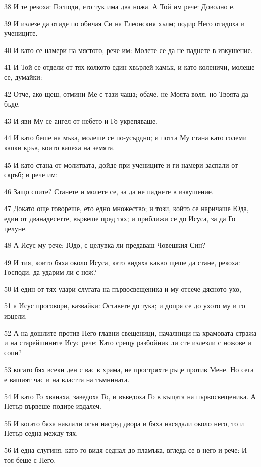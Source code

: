 \par 38 И те рекоха: Господи, ето тук има два ножа. А Той им рече: Доволно е.
\par 39 И излезе да отиде по обичая Си на Елеонския хълм; подир Него отидоха и учениците.
\par 40 И като се намери на мястото, рече им: Молете се да не паднете в изкушение.
\par 41 И Той се отдели от тях колкото един хвърлей камък, и като коленичи, молеше се, думайки:
\par 42 Отче, ако щеш, отмини Ме с тази чаша; обаче, не Моята воля, но Твоята да бъде.
\par 43 И яви Му се ангел от небето и Го укрепяваше.
\par 44 И като беше на мъка, молеше се по-усърдно; и потта Му стана като големи капки кръв, които капеха на земята.
\par 45 И като стана от молитвата, дойде при учениците и ги намери заспали от скръб; и рече им:
\par 46 Защо спите? Станете и молете се, за да не паднете в изкушение.
\par 47 Докато още говореше, ето едно множество; и този, който се наричаше Юда, един от дванадесетте, вървеше пред тях; и приближи се до Исуса, за да Го целуне.
\par 48 А Исус му рече: Юдо, с целувка ли предаваш Човешкия Син?
\par 49 И тия, които бяха около Исуса, като видяха какво щеше да стане, рекоха: Господи, да ударим ли с нож?
\par 50 И един от тях удари слугата на първосвещеника и му отсече дясното ухо,
\par 51 а Исус проговори, казвайки: Оставете до тука; и допря се до ухото му и го изцели.
\par 52 А на дошлите против Него главни свещеници, началници на храмовата стража и на старейшините Исус рече: Като срещу разбойник ли сте излезли с ножове и сопи?
\par 53 когато бях всеки ден с вас в храма, не простряхте ръце против Мене. Но сега е вашият час и на властта на тъмнината.
\par 54 И като Го хванаха, заведоха Го, и въведоха Го в къщата на първосвещеника. А Петър вървеше подире издалеч.
\par 55 И когато бяха наклали огън насред двора и бяха насядали около него, то и Петър седна между тях.
\par 56 И една слугиня, като го видя седнал до пламъка, вгледа се в него и рече: И тоя беше с Него.
